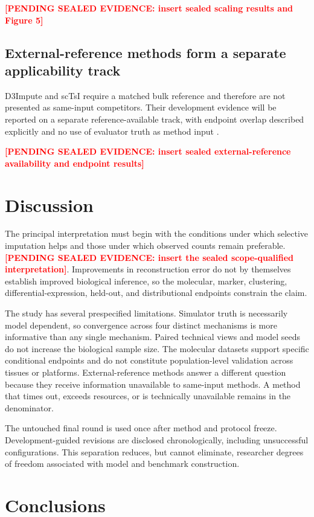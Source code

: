 \documentclass[pdflatex,sn-vancouver-num,referee,lineno]{sn-jnl}
\newcommand{\PendingResult}[1]{\textcolor{red}{\textbf{[PENDING SEALED EVIDENCE: #1]}}}
\begin{document}
\PendingResult{insert sealed scaling results and Figure 5}

\subsection{External-reference methods form a separate applicability track}

D3Impute and scTsI require a matched bulk reference and therefore are not presented as same-input competitors. Their development evidence will be reported on a separate reference-available track, with endpoint overlap described explicitly and no use of evaluator truth as method input \cite{Zhu2025D3Impute,Guan2025scTsI}.

\PendingResult{insert sealed external-reference availability and endpoint results}

\section{Discussion}

The principal interpretation must begin with the conditions under which selective imputation helps and those under which observed counts remain preferable. \PendingResult{insert the sealed scope-qualified interpretation}. Improvements in reconstruction error do not by themselves establish improved biological inference, so the molecular, marker, clustering, differential-expression, held-out, and distributional endpoints constrain the claim.

The study has several prespecified limitations. Simulator truth is necessarily model dependent, so convergence across four distinct mechanisms is more informative than any single mechanism. Paired technical views and model seeds do not increase the biological sample size. The molecular datasets support specific conditional endpoints and do not constitute population-level validation across tissues or platforms. External-reference methods answer a different question because they receive information unavailable to same-input methods. A method that times out, exceeds resources, or is technically unavailable remains in the denominator.

The untouched final round is used once after method and protocol freeze. Development-guided revisions are disclosed chronologically, including unsuccessful configurations. This separation reduces, but cannot eliminate, researcher degrees of freedom associated with model and benchmark construction.

\section{Conclusions}
\end{document}
